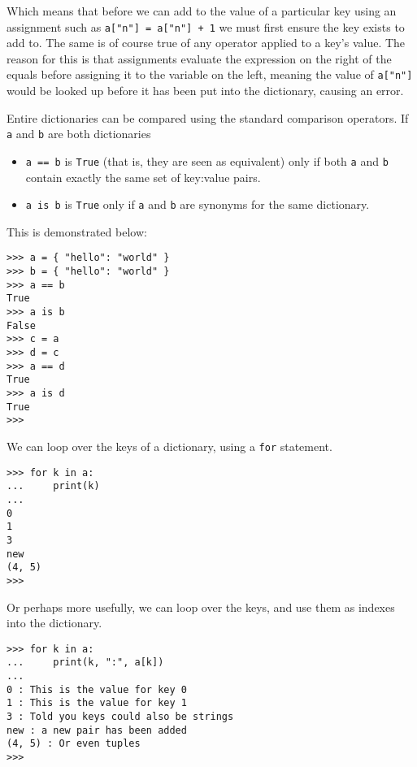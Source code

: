 Which means that before we can add to the value of a particular key   using an assignment such as \texttt{a["n"] = a["n"] + 1} we   must first ensure the key exists to add to. The same is of course true   of any operator applied to a key's value. The reason for this is that   assignments evaluate the expression on the right of the equals before   assigning it to the variable on the left, meaning the value of \texttt{a["n"]}   would be looked up before it has been put into the dictionary, causing   an error.

Entire dictionaries can be compared using the standard comparison   operators. If \texttt{a} and \texttt{b} are both dictionaries
\begin{itemize}
	\item 
\texttt{a == b} is \texttt{True} (that is, they are seen as equivalent) only if both    \texttt{a} and \texttt{b} contain exactly the same set of key:value pairs.
	\item 
\texttt{a is b} is \texttt{True} only if \texttt{a} and \texttt{b} are synonyms    for the same dictionary.
\end{itemize}

This is demonstrated below:
\begin{lstlisting}       
>>> a = { "hello": "world" }       
>>> b = { "hello": "world" }       
>>> a == b
True       
>>> a is b
False        
>>> c = a       
>>> d = c       
>>> a == d
True       
>>> a is d
True
>>>
\end{lstlisting}

We can loop over the keys of a dictionary, using a \texttt{for}   statement.
\begin{lstlisting}
>>> for k in a:
...     print(k)
... 
0
1
3
new
(4, 5)
>>>
\end{lstlisting}

Or perhaps more usefully, we can loop over the keys, and use them as   indexes into the dictionary.
\begin{lstlisting}
>>> for k in a:
...     print(k, ":", a[k])
... 
0 : This is the value for key 0
1 : This is the value for key 1
3 : Told you keys could also be strings
new : a new pair has been added
(4, 5) : Or even tuples
>>>
\end{lstlisting}


